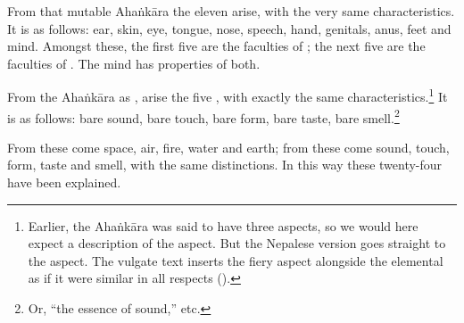 \begin{translation}
            From that mutable Ahaṅkāra the 
            eleven  arise, with the very same
            characteristics. It is as follows: ear, skin, eye, tongue, nose,
            speech, hand, genitals, anus, feet and mind.  Amongst these, the first 
            five are the faculties of ; the next five are the 
            faculties of .  The mind has properties of both.
            
            From the Ahaṅkāra as , arise the five ,
with exactly the same characteristics.\footnote{Earlier,
    the Ahaṅkāra was said to have three aspects, so we would
    here expect a description of the 
    aspect.  But the Nepalese version goes straight to the
     aspect.  The vulgate text inserts
    the fiery aspect alongside the elemental as if it were
    similar in all respects ().}  It is as
    follows: bare sound, bare touch, bare form, bare taste,
    bare smell.\footnote{Or, ``the essence of sound,'' etc.}
    
    From these  come space, air, fire, water and earth; 
    from these come sound, touch, form, taste and smell, with the same 
    distinctions.  In this way these twenty-four  have 
    been explained. 
            
    
\end{translation}
